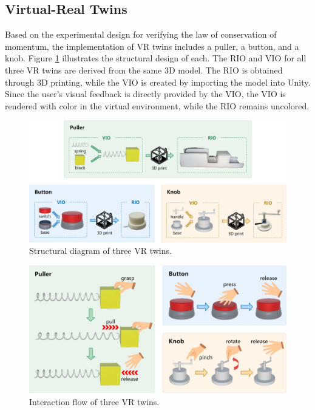 \subsection{Virtual-Real Twins}
Based on the experimental design for verifying the law of conservation of momentum, the implementation of VR twins includes a puller, a button, and a knob. Figure \ref{fig:structural-diagram} illustrates the structural design of each. The RIO and VIO for all three VR twins are derived from the same 3D model. The RIO is obtained through 3D printing, while the VIO is created by importing the model into Unity. Since the user's visual feedback is directly provided by the VIO, the VIO is rendered with color in the virtual environment, while the RIO remains uncolored.

\begin{figure}[t]
  \centering
  \includegraphics[width=1\textwidth]{image/Structural-Diagram.pdf} %
  \caption{Structural diagram of three VR twins.}
  \label{fig:structural-diagram}
\end{figure}

\begin{figure}[t]
  \centering
  \includegraphics[width=1\textwidth]{image/Interaction-Flow.pdf}
  \caption{Interaction flow of three VR twins.}
  \label{fig:interaction-flow}
\end{figure}

